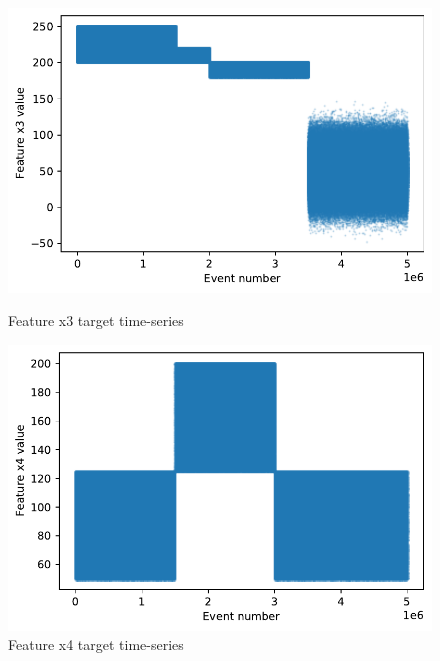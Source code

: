 \begin{figure}[!htb]
\begin{minipage}[b]{0.5\linewidth}
    \includegraphics[width=1\linewidth]{figures/timeseries-t6-x3.pdf} 
    \caption{Feature x3 target time-series} 
    \label{fig:timeseries-t6-x3} 
    \vspace{4ex}
  \end{minipage}%
  \begin{minipage}[b]{0.5\linewidth}
    \centering
    \includegraphics[width=1\linewidth]{figures/timeseries-t6-x4.pdf} 
    \caption{Feature x4 target time-series} 
    \label{fig:timeseries-t6-x4} 
    \vspace{4ex}
  \end{minipage} 
\end{figure}

